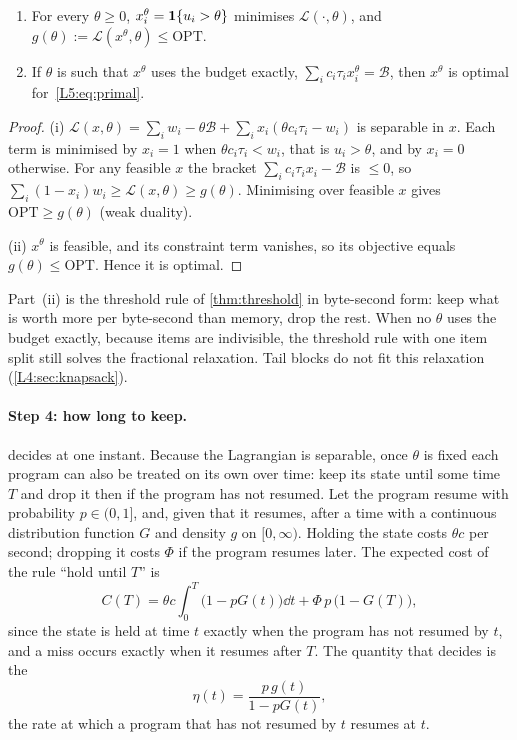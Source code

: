 \begin{proposition}\label{L5:prop:shadow}
\begin{enumerate}[label=(\roman*)]
\item For every $\theta\ge0$, $x^\theta_i=\mathbf{1}\{u_i>\theta\}$ minimises
  $\mathcal{L}(\cdot,\theta)$, and $g(\theta):=\mathcal{L}(x^\theta,\theta)\le\mathrm{OPT}$.
\item If $\theta$ is such that $x^\theta$ uses the budget exactly,
  $\sum_ic_i\tau_ix^\theta_i=\mathcal B$, then $x^\theta$ is optimal
  for~\eqref{L5:eq:primal}.
\end{enumerate}
\end{proposition}

\begin{proof}
(i) $\mathcal{L}(x,\theta)=\sum_iw_i-\theta\mathcal B+\sum_ix_i(\theta c_i\tau_i-w_i)$
is separable in $x$. Each term is minimised by $x_i=1$ when
$\theta c_i\tau_i<w_i$, that is $u_i>\theta$, and by $x_i=0$ otherwise.
For any feasible $x$ the bracket $\sum_ic_i\tau_ix_i-\mathcal B$ is $\le0$, so
$\sum_i(1-x_i)w_i\ge\mathcal{L}(x,\theta)\ge g(\theta)$. Minimising over
feasible $x$ gives $\mathrm{OPT}\ge g(\theta)$ (weak duality).

(ii) $x^\theta$ is feasible, and its constraint term vanishes, so its
objective equals $g(\theta)\le\mathrm{OPT}$. Hence it is optimal.
\end{proof}

Part~(ii) is the threshold rule of \cref{thm:threshold} in byte-second form:
keep what is worth more per byte-second than memory, drop the rest. When
no $\theta$ uses the budget exactly, because items are indivisible, the threshold
rule with one item split still solves the fractional relaxation. Tail blocks do not
fit this relaxation (\cref{L4:sec:knapsack}).

\paragraph{Step 4: how long to keep.}  decides at one instant.
Because the Lagrangian is separable, once $\theta$ is fixed each program can also be
treated on its own over time: keep its state until some time $T$ and drop it then if the
program has not resumed. Let the program resume with probability $p\in(0,1]$, and, given
that it resumes, after a time with a continuous distribution function $G$ and density
$g$ on $[0,\infty)$. Holding the state costs $\theta c$ per second; dropping it costs
$\Phi$ if the program resumes later. The expected cost of the rule ``hold until $T$'' is
\begin{equation}\label{L5:eq:hold-cost}
  C(T)=\theta c\int_0^T\bigl(1-pG(t)\bigr)\dd t+\Phi\,p\,\bigl(1-G(T)\bigr),
\end{equation}
since the state is held at time $t$ exactly when the program has not resumed by $t$,
and a miss occurs exactly when it resumes after $T$. The quantity that decides is the
\[
  \eta(t)=\frac{p\,g(t)}{1-pG(t)},
\]
the rate at which a program that has not resumed by $t$ resumes at $t$.

